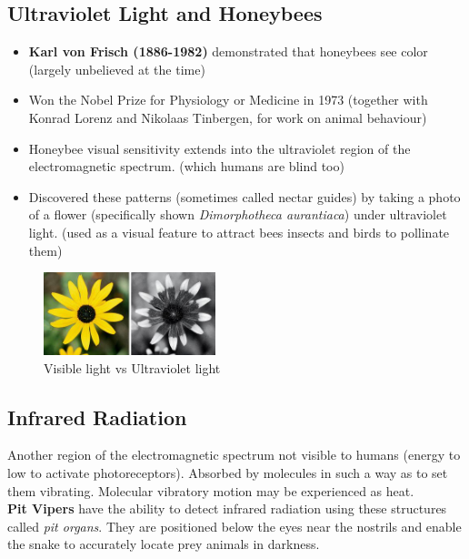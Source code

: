 \documentclass{article}
\begin{document}
\subsection{Ultraviolet Light and Honeybees}
\begin{itemize}
    \item \textbf{Karl von Frisch (1886-1982)} demonstrated that honeybees see color (largely unbelieved at the time)
    \item Won the Nobel Prize for Physiology or Medicine in 1973 (together with Konrad Lorenz and Nikolaas Tinbergen, for work on animal behaviour)
    \item Honeybee visual sensitivity extends into the ultraviolet region of the electromagnetic spectrum. (which humans are blind too)
    \item Discovered these patterns (sometimes called nectar guides) by taking a photo of a flower (specifically shown \textit{Dimorphotheca aurantiaca}) under ultraviolet light. (used as a visual feature to attract bees insects and birds to pollinate them)
\end{itemize}

\begin{figure}[htp]
\centering
\includegraphics[width=5cm]{images/uvlightflowers.jpg}
\caption{Visible light vs Ultraviolet light}
\label{fig: UV flowers}
\end{figure}

\subsection{Infrared Radiation}

 Another region of the electromagnetic spectrum not visible to humans (energy to low to activate photoreceptors). Absorbed by molecules in such a way as to set them vibrating. Molecular vibratory motion may be experienced as heat. \\
 
 \textbf{Pit Vipers} have the ability to detect infrared radiation using these structures called \textit{pit organs}. They are positioned below the eyes near the nostrils and enable the snake to accurately locate prey animals in darkness. \\
\end{document}
